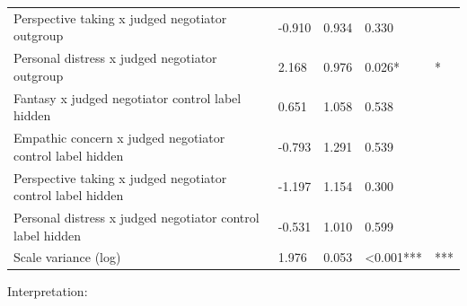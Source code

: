 \documentclass[11pt]{article}
\begin{document}
\begin{table}[H]
{\begin{tabular}{lllll}
Perspective taking x judged negotiator outgroup & -0.910 & 0.934 & 0.330 &  \\
Personal distress x judged negotiator outgroup & 2.168 & 0.976 & 0.026* & * \\
Fantasy x judged negotiator control label hidden & 0.651 & 1.058 & 0.538 &  \\
Empathic concern x judged negotiator control label hidden & -0.793 & 1.291 & 0.539 &  \\
Perspective taking x judged negotiator control label hidden & -1.197 & 1.154 & 0.300 &  \\
Personal distress x judged negotiator control label hidden & -0.531 & 1.010 & 0.599 &  \\
Scale variance (log) & 1.976 & 0.053 & <0.001*** & *** \\
\bottomrule
\end{tabular}
}
\end{table}

Interpretation:
\end{document}
